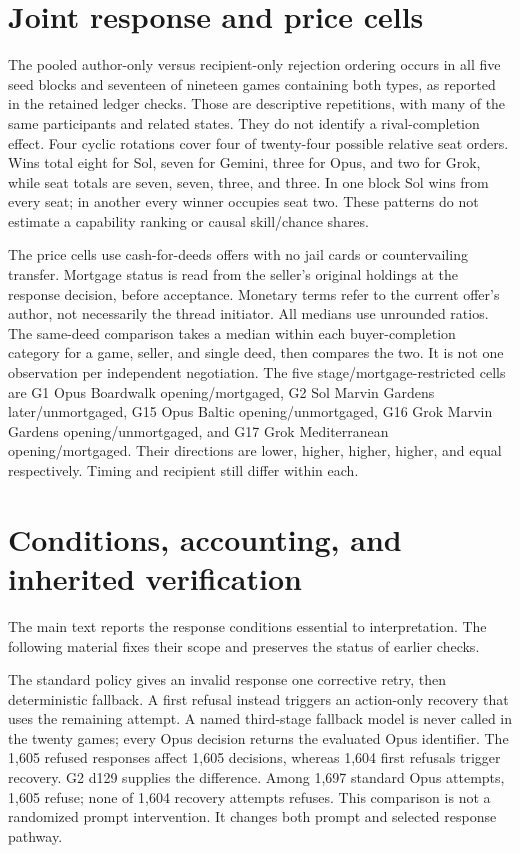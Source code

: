 \section{Joint response and price cells}
\label{app:joint}



The pooled author-only versus recipient-only rejection ordering occurs in all five seed blocks and seventeen of nineteen games containing both types, as reported in the retained ledger checks. Those are descriptive repetitions, with many of the same participants and related states. They do not identify a rival-completion effect. Four cyclic rotations cover four of twenty-four possible relative seat orders. Wins total eight for Sol, seven for Gemini, three for Opus, and two for Grok, while seat totals are seven, seven, three, and three. In one block Sol wins from every seat; in another every winner occupies seat two. These patterns do not estimate a capability ranking or causal skill/chance shares.

\label{app:prices}


The price cells use cash-for-deeds offers with no jail cards or countervailing transfer. Mortgage status is read from the seller's original holdings at the response decision, before acceptance. Monetary terms refer to the current offer's author, not necessarily the thread initiator. All medians use unrounded ratios. The same-deed comparison takes a median within each buyer-completion category for a game, seller, and single deed, then compares the two. It is not one observation per independent negotiation. The five stage/mortgage-restricted cells are G1 Opus Boardwalk opening/mortgaged, G2 Sol Marvin Gardens later/unmortgaged, G15 Opus Baltic opening/unmortgaged, G16 Grok Marvin Gardens opening/unmortgaged, and G17 Grok Mediterranean opening/mortgaged. Their directions are lower, higher, higher, higher, and equal respectively. Timing and recipient still differ within each.

\section{Conditions, accounting, and inherited verification}
\label{app:conditions}

The main text reports the response conditions essential to interpretation. The following material fixes their scope and preserves the status of earlier checks.

The standard policy gives an invalid response one corrective retry, then deterministic fallback. A first refusal instead triggers an action-only recovery that uses the remaining attempt. A named third-stage fallback model is never called in the twenty games; every Opus decision returns the evaluated Opus identifier. The 1,605 refused responses affect 1,605 decisions, whereas 1,604 first refusals trigger recovery. G2 d129 supplies the difference. Among 1,697 standard Opus attempts, 1,605 refuse; none of 1,604 recovery attempts refuses. This comparison is not a randomized prompt intervention. It changes both prompt and selected response pathway.

